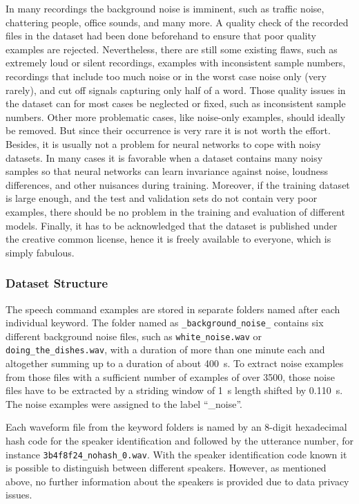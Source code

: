 In many recordings the background noise is imminent, such as traffic noise, chattering people, office sounds, and many more.
A quality check of the recorded files in the dataset had been done beforehand to ensure that poor quality examples are rejected.
Nevertheless, there are still some existing flaws, such as extremely loud or silent recordings, examples with inconsistent sample numbers, recordings that include too much noise or in the worst case noise only (very rarely), and cut off signals capturing only half of a word.
Those quality issues in the dataset can for most cases be neglected or fixed, such as inconsistent sample numbers. 
Other more problematic cases, like noise-only examples, should ideally be removed.
But since their occurrence is very rare it is not worth the effort.
Besides, it is usually not a problem for neural networks to cope with noisy datasets.
In many cases it is favorable when a dataset contains many noisy samples so that neural networks can learn invariance against noise, loudness differences, and other nuisances during training.
Moreover, if the training dataset is large enough, and the test and validation sets do not contain very poor examples, there should be no problem in the training and evaluation of different models.
Finally, it has to be acknowledged that the dataset is published under the creative common license, hence it is freely available to everyone, which is simply fabulous.



\subsubsection{Dataset Structure}\label{sec:exp_dataset_structure}
The speech command examples are stored in separate folders named after each individual keyword.
The folder named as \texttt{\_background\_noise\_} contains six different background noise files, such as \texttt{white\_noise.wav} or \texttt{doing\_the\_dishes.wav}, with a duration of more than one minute each and altogether summing up to a duration of about \SI{400}{s}.
To extract noise examples from those files with a sufficient number of examples of over 3500, those noise files have to be extracted by a striding window of \SI{1}{\second} length shifted by \SI{0.110}{\second}.
The noise examples were assigned to the label \enquote{\_noise}.

Each waveform file from the keyword folders is named by an 8-digit hexadecimal hash code for the speaker identification and followed by the utterance number, for instance \texttt{3b4f8f24\_nohash\_0.wav}.
With the speaker identification code known it is possible to distinguish between different speakers.
However, as mentioned above, no further information about the speakers is provided due to data privacy issues.

